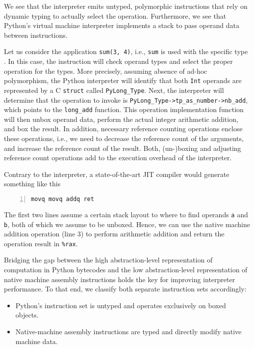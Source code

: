 \documentclass[preprint,10pt]{popl14conf}
\newcommand{\pyType}[1]{\texttt{Py#1\_Type}}
\begin{document}
We see that the interpreter emits untyped, polymorphic instructions that rely on dynamic typing to
actually select the operation.
Furthermore, we see that Python's virtual machine interpreter implements a stack to pass operand
data between instructions.

Let us consider the application \texttt{sum(3, 4)}, i.e., \texttt{sum} is used with the specific
type .
In this case, the \binaryAdd{} instruction will check operand types and select the proper operation
for the types.
More precisely, assuming absence of ad-hoc polymorphism, the Python interpreter will identify that
both \texttt{Int} operands are represented by a C \texttt{struct} called \pyType{Long}.
Next, the interpreter will determine that the operation to invoke is
\pyType{Long}\texttt{->tp_as_number->nb_add}, which points to the \texttt{long_add} function.
This operation implementation function will then unbox operand data, perform the actual integer
arithmetic addition, and box the result.
In addition, necessary reference counting operations enclose these operations, i.e., we need to
decrease the reference count of the arguments, and increase the reference count of the result.
Both, (un-)boxing and adjusting reference count operations add to the execution overhead of the
interpreter.

Contrary to the interpreter, a state-of-the-art JIT compiler would generate something like this
\begin{lstlisting}[morekeywords={rax,rbx,rsp,movq,addq,ret},numbers=left,numberstyle=\tiny,style=othercode]
movq movq addq ret
\end{lstlisting}
The first two lines assume a certain stack layout to where to find operands \texttt{a} and
\texttt{b}, both of which we assume to be unboxed.
Hence, we can use the native machine addition operation (line 3) to perform arithmetic addition and
return the operation result in \texttt{\%rax}.

Bridging the gap between the high abstraction-level representation of computation in Python
bytecodes and the low abstraction-level representation of native machine assembly instructions holds
the key for improving interpreter performance.
To that end, we classify both separate instruction sets accordingly:
\begin{itemize}
\item Python's instruction set is untyped and operates exclusively on boxed objects.
\item Native-machine assembly instructions are typed and directly modify native machine data.
\end{itemize}
\end{document}

